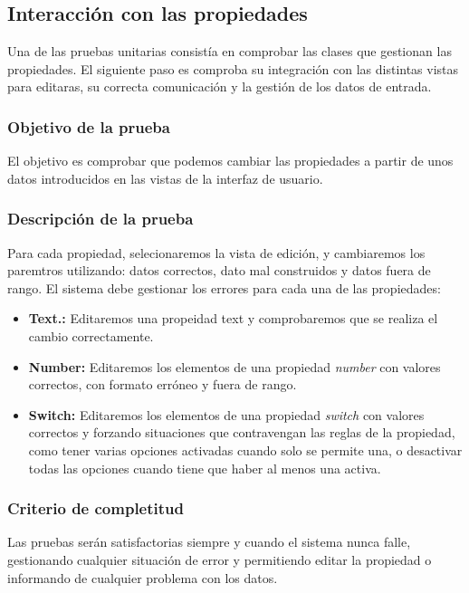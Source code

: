 \subsection{Interacción con las propiedades}

Una de las pruebas unitarias consistía en comprobar las clases que gestionan las propiedades. El siguiente paso es comproba su integración con las distintas vistas para editaras, su correcta comunicación y la gestión de los datos de entrada.


\subsubsection{Objetivo de la prueba}

El objetivo es comprobar que podemos cambiar las propiedades a partir de unos datos introducidos en las vistas de la interfaz de usuario.

\subsubsection{Descripción de la prueba}

Para cada propiedad, selecionaremos la vista de edición, y cambiaremos los paremtros utilizando: datos correctos, dato mal construidos y datos fuera de rango. El sistema debe gestionar los errores para cada una de las propiedades:


\begin{itemize}
  \item \textbf{Text.:} Editaremos una propeidad text y comprobaremos que se realiza el cambio correctamente.
  \item \textbf{Number:} Editaremos los elementos de una propiedad \textit{number} con valores correctos, con formato erróneo y fuera de rango.
  \item \textbf{Switch:} Editaremos los elementos de una propiedad \textit{switch} con valores correctos y forzando situaciones que contravengan las reglas de la propiedad, como tener varias opciones activadas cuando solo se permite una, o desactivar todas las opciones cuando tiene que haber al menos una activa.
\end{itemize}


\subsubsection{Criterio de completitud}

Las pruebas serán satisfactorias siempre y cuando el sistema nunca falle, gestionando cualquier situación de error y permitiendo editar la propiedad o informando de cualquier problema con los datos.

